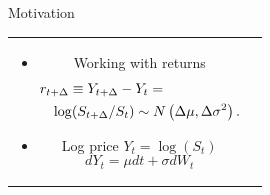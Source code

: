 \documentclass{beamer}
\begin{document}
\begin{frame}{Motivation}

\begin{tabular}{cc}
\begin{minipage}{0.5\textwidth}
	\begin{itemize}
		\item Working with returns
		\begin{eqnarray*} 
			\lefteqn{ r_{t+\Delta} \equiv Y_{t + \Delta} - Y_t = } \\
			&&\log(S_{t+\Delta}/S_t) \sim N\left( \Delta \mu, \Delta \sigma^2\right).
		\end{eqnarray*}
		
		\pause	
		\item Log price $Y_t = \log(S_t)$
		\[ d Y_t = \mu dt + \sigma dW_t \]
		

\end{itemize}
\end{minipage}
\end{tabular}
\end{frame}
\end{document}
